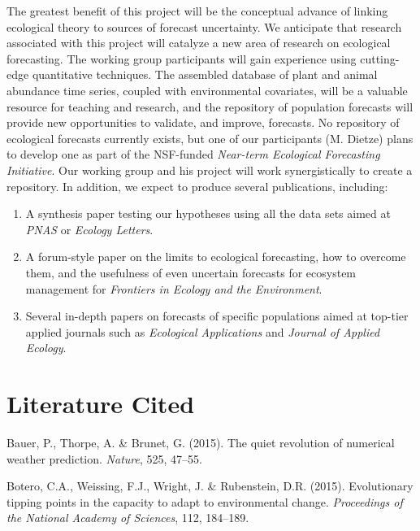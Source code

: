 \documentclass[12pt,]{article}
\providecommand{\tightlist}{%
  \setlength{\itemsep}{0pt}\setlength{\parskip}{0pt}}
\begin{document}
The greatest benefit of this project will be the conceptual advance of
linking ecological theory to sources of forecast uncertainty. We
anticipate that research associated with this project will catalyze a
new area of research on ecological forecasting. The working group
participants will gain experience using cutting-edge quantitative
techniques. The assembled database of plant and animal abundance time
series, coupled with environmental covariates, will be a valuable
resource for teaching and research, and the repository of population
forecasts will provide new opportunities to validate, and improve,
forecasts. No repository of ecological forecasts currently exists, but
one of our participants (M. Dietze) plans to develop one as part of the
NSF-funded \emph{Near-term Ecological Forecasting Initiative}. Our
working group and his project will work synergistically to create a
repository. In addition, we expect to produce several publications,
including:

\begin{enumerate}
\def\labelenumi{\arabic{enumi}.}
\tightlist
\item
  A synthesis paper testing our hypotheses using all the data sets aimed
  at \emph{PNAS} or \emph{Ecology Letters}.
\item
  A forum-style paper on the limits to ecological forecasting, how to
  overcome them, and the usefulness of even uncertain forecasts for
  ecosystem management for \emph{Frontiers in Ecology and the
  Environment}.
\item
  Several in-depth papers on forecasts of specific populations aimed at
  top-tier applied journals such as \emph{Ecological Applications} and
  \emph{Journal of Applied Ecology}.
\end{enumerate}

\section{Literature Cited}\label{references}

\hypertarget{refs}{}
\hypertarget{ref-Bauer2015}{}
Bauer, P., Thorpe, A. \& Brunet, G. (2015). The quiet revolution of
numerical weather prediction. \emph{Nature}, 525, 47--55.

\hypertarget{ref-Botero2015}{}
Botero, C.A., Weissing, F.J., Wright, J. \& Rubenstein, D.R. (2015).
Evolutionary tipping points in the capacity to adapt to environmental
change. \emph{Proceedings of the National Academy of Sciences}, 112,
184--189.
\end{document}
